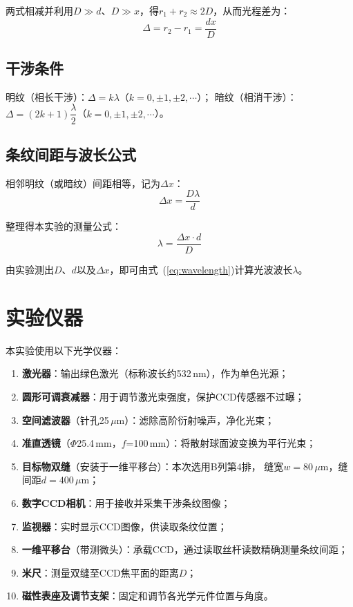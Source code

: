 \documentclass[12pt, a4paper]{article}
\begin{document}
两式相减并利用$D \gg d$、$D \gg x$，得$r_1 + r_2 \approx 2D$，从而光程差为：
\begin{equation}
  \Delta = r_2 - r_1 = \frac{dx}{D}
\end{equation}

\subsection{干涉条件}

明纹（相长干涉）：$\Delta = k\lambda$（$k = 0,\pm1,\pm2,\cdots$）；
暗纹（相消干涉）：$\Delta = (2k+1)\dfrac{\lambda}{2}$（$k = 0,\pm1,\pm2,\cdots$）。

\subsection{条纹间距与波长公式}

相邻明纹（或暗纹）间距相等，记为$\Delta x$：
\begin{equation}
  \Delta x = \frac{D\lambda}{d}
  \label{eq:fringe_spacing}
\end{equation}

整理得本实验的测量公式：
\begin{equation}
  \lambda = \frac{\Delta x \cdot d}{D}
  \label{eq:wavelength}
\end{equation}

由实验测出$D$、$d$以及$\Delta x$，即可由式~(\ref{eq:wavelength})计算光波波长$\lambda$。

\section{实验仪器}

本实验使用以下光学仪器：
\begin{enumerate}
  \item \textbf{激光器}：输出绿色激光（标称波长约532\,nm），作为单色光源；
  \item \textbf{圆形可调衰减器}：用于调节激光束强度，保护CCD传感器不过曝；
  \item \textbf{空间滤波器}（针孔25\,$\mu$m）：滤除高阶衍射噪声，净化光束；
  \item \textbf{准直透镜}（$\Phi$25.4\,mm，$f$=100\,mm）：将散射球面波变换为平行光束；
  \item \textbf{目标物双缝}（安装于一维平移台）：本次选用B列第4排，
        缝宽$w = 80\,\mu\text{m}$，缝间距$d = 400\,\mu\text{m}$；
  \item \textbf{数字CCD相机}：用于接收并采集干涉条纹图像；
  \item \textbf{监视器}：实时显示CCD图像，供读取条纹位置；
  \item \textbf{一维平移台}（带测微头）：承载CCD，通过读取丝杆读数精确测量条纹间距；
  \item \textbf{米尺}：测量双缝至CCD焦平面的距离$D$；
  \item \textbf{磁性表座及调节支架}：固定和调节各光学元件位置与角度。
\end{enumerate}
\end{document}

